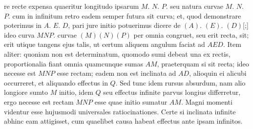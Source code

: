 re recte expensa quaeritur longitudo ipsarum $\displaystyle M$. $\displaystyle N$. $\displaystyle P$.
seu natura curvae $\displaystyle M$. $\displaystyle N$. $\displaystyle P$. 
cum in infinitum\protect{} retro eadem semper futura sit curva;
et, quod demonstrare poterimus in $\displaystyle A$. $\displaystyle E$. $\displaystyle D$,
pari jure initio potuerimus dicere de $\displaystyle (A)$. $\displaystyle (E)$. $\displaystyle (D)$[;]
ideo curva $\displaystyle MNP$. curvae $\displaystyle (M)(N)(P)$ per omnia congruet,
seu erit recta,
 sit;
erit utique tangens ejus talis,
ut certum aliquem angulum faciat ad $\displaystyle AED$.
\pend
\pstart
Item aliter: quoniam non est determinatum,
quomodo sumi debeat una ex rectis,
proportionalia fiant omnia quamcunque sumas $\displaystyle AM$, praeterquam si sit recta;
ideo necesse est $\displaystyle MNP$ esse rectam;
eadem non est inclinata ad $\displaystyle AD$,
alioquin ei alicubi occurreret,
et aliquando effectus
%
{}
in $\displaystyle Q$.
Sed tunc idem rursus absurdum,
nam alio longiore sumto $\displaystyle M$ initio, idem $\displaystyle Q$ seu effectus infinite parvus\protect{}
longius differretur,
ergo necesse est rectam $\displaystyle MNP$ esse
quae initio sumatur $\displaystyle AM$.
Magni momenti videntur esse hujusmodi universales ratiocinationes.
Certe si inclinata
infinite abhinc eam attigisset, cum quaelibet causa\protect{} habeat
effectus ante ipsam infinitos\protect{}.
